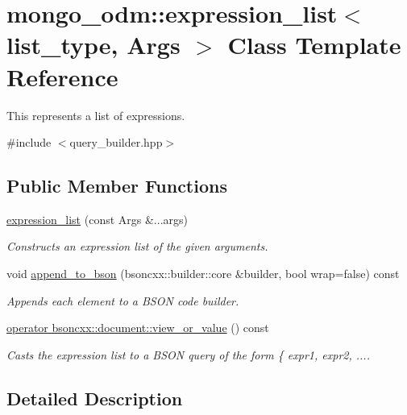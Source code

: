 \hypertarget{classmongo__odm_1_1expression__list}{}\section{mongo\+\_\+odm\+:\+:expression\+\_\+list$<$ list\+\_\+type, Args $>$ Class Template Reference}
\label{classmongo__odm_1_1expression__list}


This represents a list of expressions.  




{\ttfamily \#include $<$query\+\_\+builder.\+hpp$>$}

\subsection*{Public Member Functions}
\begin{DoxyCompactItemize}
\item 
\hyperlink{classmongo__odm_1_1expression__list_a005746d6c92dc87c719a0e8029493590}{expression\+\_\+list} (const Args \&...args)
\begin{DoxyCompactList}\small\item\em Constructs an expression list of the given arguments. \end{DoxyCompactList}\item 
void \hyperlink{classmongo__odm_1_1expression__list_a85ac4de221b14cf6adf52945fd9f7507}{append\+\_\+to\+\_\+bson} (bsoncxx\+::builder\+::core \&builder, bool wrap=false) const 
\begin{DoxyCompactList}\small\item\em Appends each element to a B\+S\+ON code builder. \end{DoxyCompactList}\item 
\hyperlink{classmongo__odm_1_1expression__list_a210238378d08926cab580c63dec1a31c}{operator bsoncxx\+::document\+::view\+\_\+or\+\_\+value} () const 
\begin{DoxyCompactList}\small\item\em Casts the expression list to a B\+S\+ON query of the form \{ expr1, expr2, .... \end{DoxyCompactList}\end{DoxyCompactItemize}


\subsection{Detailed Description}
